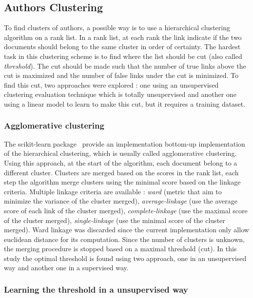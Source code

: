 \subsection{Authors Clustering}

To find clusters of authors, a possible way is to use a hierarchical clustering algorithm on a rank list.
In a rank list, at each rank the link indicate if the two documents should belong to the same cluster in order of certainty.
The hardest task in this clustering scheme is to find where the list should be cut (also called \textit{threshold}).
The cut should be made such that the number of true links above the cut is maximized and the number of false links under the cut is minimized.
To find this cut, two approaches were explored : one using an unsupervised clustering evaluation technique which is totally unsupervised and another one using a linear model to learn to make this cut, but it requires a training dataset.

\subsubsection{Agglomerative clustering}

The scikit-learn package~\cite{sklearn} provide an implementation bottom-up implementation of the hierarchical clustering, which is usually called agglomerative clustering.
Using this approach, at the start of the algorithm, each document belong to a different cluster.
Clusters are merged based on the scores in the rank list, each step the algorithm merge clusters using the minimal score based on the linkage criteria.
Multiple linkage criteria are available : \textit{ward} (metric that aim to minimize the variance of the cluster merged), \textit{average-linkage} (use the average score of each link of the cluster merged), \textit{complete-linkage} (use the maximal score of the cluster merged), \textit{single-linkage} (use the minimal score of the cluster merged).
Ward linkage was discarded since the current implementation only allow euclidean distance for its computation.
Since the number of clusters is unknown, the merging procedure is stopped based on a maximal threshold (cut).
In this study the optimal threshold is found using two approach, one in an unsupervised way and another one in a supervised way.

\subsubsection{Learning the threshold in a unsupervised way}

